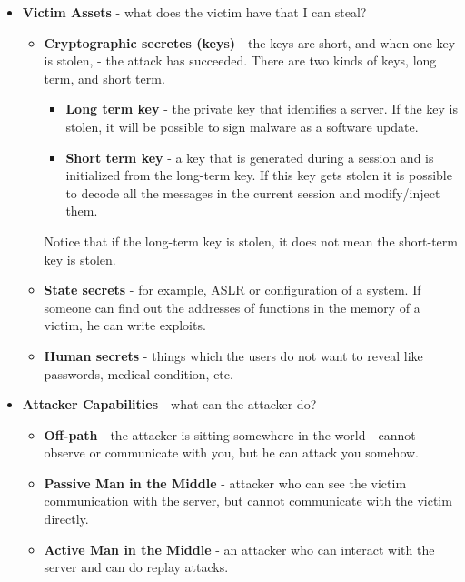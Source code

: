 \begin{itemize}
    \item \textbf{Victim Assets} - what does the victim have that I can steal? 
        \begin{itemize}
            \item \textbf{Cryptographic secretes (keys)} -  the keys are short,
            and when one key is stolen, - the attack has succeeded. There are
            two kinds of keys, long term, and short term.
                \begin{itemize}
                    \item \textbf{Long term key } - the private key that
                    identifies a server. If the key is stolen, it will be possible
                    to sign malware as a software update.
                    \item \textbf{Short term key} - a key that is generated during
                    a session and is initialized from the long-term key. If this key gets stolen  it is possible to decode all the messages in the current session and modify/inject them.
                \end{itemize}
                Notice that if the long-term key is stolen, it does not mean the short-term key is stolen.
            \item \textbf{State secrets} - for example, ASLR or configuration of
            a system. If someone can find out the addresses of functions in the
            memory of a victim, he can write exploits. 
            \item \textbf{Human secrets} - things which the users do not want to
            reveal like passwords, medical condition, etc.
        \end{itemize}
    \item \textbf{Attacker Capabilities} - what can the attacker do?
        \begin{itemize}
            \item \textbf{Off-path} - the attacker is sitting somewhere in the
            world - cannot observe or communicate with you, but he can attack you
            somehow. 
            \item \textbf{Passive Man in the Middle} - attacker who can see the
            victim communication with the server, but cannot communicate with the victim directly.
            \item \textbf{Active Man in the Middle} - an attacker who can
            interact with the server and can do replay attacks.

\end{itemize}
\end{itemize}
